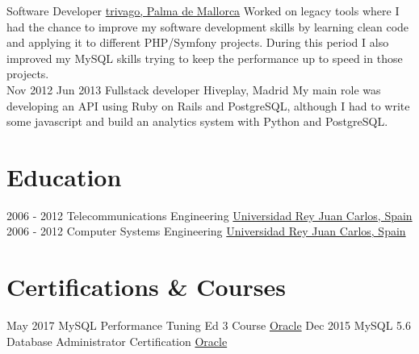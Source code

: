 \documentclass[letterpaper]{twentysecondcv} %
\begin{document}
\begin{twenty}
        {Software Developer}
        {\href{https://www.trivago.com}{trivago, Palma de Mallorca}}
        {Worked on legacy tools where I had the chance to improve my software development skills by learning clean code and applying it to different PHP/Symfony projects. During this period I also improved my MySQL skills trying to keep the performance up to speed in those projects.}
        \\
\twentyitem
    	{Nov 2012}
	{Jun 2013}
        {Fullstack developer}
        {Hiveplay, Madrid}
	{My main role was developing an API using Ruby on Rails and PostgreSQL, although I had to write some javascript and build an analytics system with Python and PostgreSQL.}
        \\
\end{twenty}

\section{Education}

\begin{twenty} %
	\twentyitem
    	{2006 - 2012}
        {}
        {Telecommunications Engineering}
        {\href{https://www.urjc.es/}{Universidad Rey Juan Carlos, Spain}}
        {}
        {}
	\twentyitem
    	{2006 - 2012}
		{}
        {Computer Systems Engineering}
        {\href{https://www.urjc.es/}{Universidad Rey Juan Carlos, Spain}}
        {}
        {}
\end{twenty}

\section{Certifications \& Courses}

\begin{twenty} %
	\twentyitem
    	{May 2017}
	{}
        {MySQL Performance Tuning Ed 3 Course}
        {\href{https://education.oracle.com/pls/web_prod-plq-dad/db_pages.getpage?page_id=609&get_params=dc:D66439,clang:EN}{Oracle}}
        {}
        {}
	\twentyitem
    	{Dec 2015}
        {}
        {MySQL 5.6 Database Administrator Certification}
        {\href{https://education.oracle.com/pls/web_prod-plq-dad/db_pages.getpage?page_id=5001&get_params=p_exam_id:1Z0-883}{Oracle}}
        {}
        {}
\end{twenty}
\end{document}
